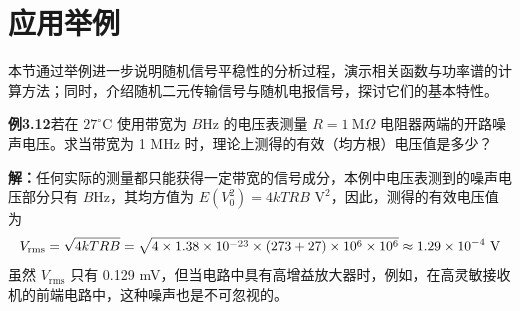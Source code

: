 \documentclass[11pt,openany,UTF8]{ctexbook}
\begin{document}
\section{应用举例}
本节通过举例进一步说明随机信号平稳性的分析过程\nobreak，演示相关函数与功率谱的计算方法\nobreak；同时\nobreak，介绍随机二元传输信号与随机电报信号\nobreak，探讨它们的基本特性\nobreak。

\begin{examplebox}
\textbf{例3.12}\quad 若在 $27^{\circ}\mathrm{C}$ 使用带宽为 $B$Hz 的电压表测量 $R=1\ \mathrm{M}\Omega$ 电阻器两端的开路噪声电压\nobreak。求当带宽为 1 MHz 时\nobreak，理论上测得的有效（均方根\nobreak）电压值是多少\nobreak？

\textbf{解\nobreak：}\quad 任何实际的测量都只能获得一定带宽的信号成分\nobreak，本例中电压表测到的噪声电压部分只有 $B$Hz\nobreak，其均方值为 $E(V_0^2)=4kTRB$ $\mathrm{V}^2$\nobreak，因此\nobreak，测得的有效电压值为
\[
\resizebox{\linewidth}{!}{$\displaystyle
V_{\mathrm{rms}}=\sqrt{4kTRB}=\sqrt{4\times1.38\times10^{-23}\times(273+27)\times10^6\times10^6}\approx1.29\times10^{-4}\ \mathrm{V}$}
\]
虽然 $V_{\mathrm{rms}}$ 只有 0.129 mV\nobreak，但当电路中具有高增益放大器时\nobreak，例如\nobreak，在高灵敏接收机的前端电路中\nobreak，这种噪声也是不可忽视的\nobreak。
\end{examplebox}
\end{document}
